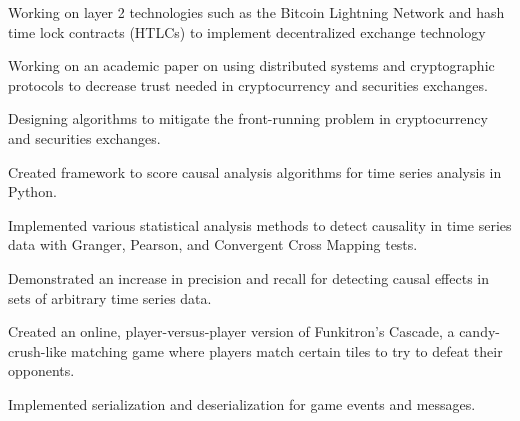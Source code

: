 
\begin{tightemize}
  \item Working on layer 2 technologies such as the Bitcoin Lightning Network and hash time lock contracts (HTLCs) to implement decentralized exchange technology
  \item Working on an academic paper on using distributed systems and cryptographic protocols to decrease trust needed in cryptocurrency and securities exchanges.
  \item Designing algorithms to mitigate the front-running problem in cryptocurrency and securities exchanges.
\end{tightemize}
\subsectionsep

\begin{tightemize}
\item Created framework to score causal analysis algorithms for time series
  analysis in Python.
\item Implemented various statistical analysis methods to detect causality in
  time series data with Granger, Pearson, and Convergent Cross Mapping tests.
\item Demonstrated an increase in precision and recall for detecting causal effects in sets of
  arbitrary time series data.
\end{tightemize}
\subsectionsep

\begin{tightemize}
\item Created an online, player-versus-player version of Funkitron's Cascade,
  a candy-crush-like matching game where players match certain tiles to try to
  defeat their opponents.
\item Implemented serialization and deserialization for game events and messages.
\end{tightemize}
\subsectionsep